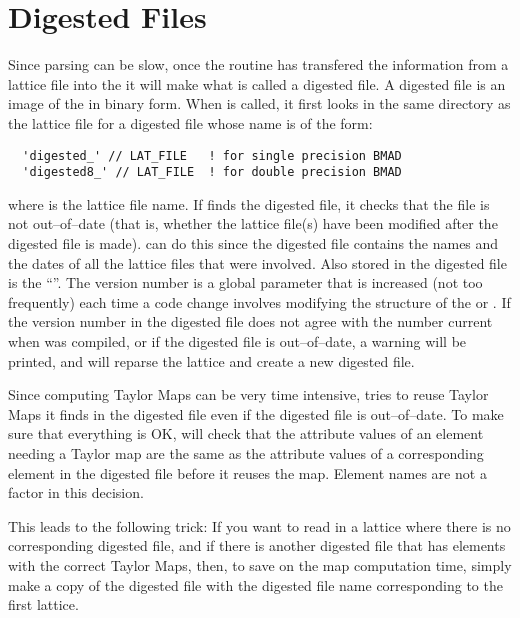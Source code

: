 \section{Digested Files}

Since parsing can be slow, once the  routine
has transfered the
information from a lattice file into the  it will make
what is called a digested file. A digested file is an image of the
 in binary form. When  is called, 
it first looks in the same directory as the lattice
file for a digested file whose name is of the form:
\begin{verbatim}
  'digested_' // LAT_FILE   ! for single precision BMAD 
  'digested8_' // LAT_FILE  ! for double precision BMAD 
\end{verbatim}
where  is the lattice file name. If  finds the digested
file, it checks that the file is not out--of--date (that is, whether the
lattice file(s) have been modified after the digested file is made).
 can do this since the digested file contains the names
and the dates of all the lattice files that were involved. Also stored
in the digested file is the ``\bmad {}''. The \bmad
version number is a global parameter that is increased (not too
frequently) each time a code change involves modifying the structure of
the  or . If the \bmad version number in
the digested file does not agree with the number current when 
was compiled, or if the digested
file is out--of--date, a warning will be printed, and 
will reparse the lattice and create a new digested file.

Since computing Taylor Maps can be very time intensive,
 tries to reuse Taylor Maps it finds in the digested
file even if the digested file is out--of--date. To
make sure that everything is OK,  will check that the attribute
values of an element needing a Taylor map are the same as the
attribute values of a corresponding element in the digested file
before it reuses the map. Element names are not a factor in this
decision.

This leads to the following trick: If you want to read in a lattice
where there is no corresponding digested file, and if there is another
digested file that has elements with the correct Taylor Maps, then, to
save on the map computation time, simply make a copy of the digested
file with the digested file name corresponding to the first lattice.

